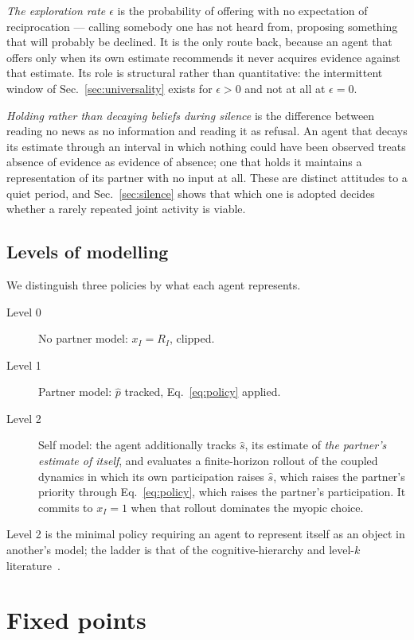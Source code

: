 \documentclass[aps,pre,twocolumn,superscriptaddress,floatfix,longbibliography]{revtex4-2}
\begin{document}
\emph{The exploration rate $\epsilon$} is the probability of offering
with no expectation of reciprocation --- calling somebody one has not heard from,
proposing something that will probably be declined. It is the only route back,
because an agent that offers only when its own estimate recommends it never
acquires evidence against that estimate. Its role is structural rather than
quantitative: the intermittent window of Sec.~\ref{sec:universality} exists for
$\epsilon>0$ and not at all at $\epsilon=0$.

\emph{Holding rather than decaying beliefs during silence} is the
difference between reading no news as no information and reading it as refusal.
An agent that decays its estimate through an interval in which nothing could
have been observed treats absence of evidence as evidence of absence; one that
holds it maintains a representation of its partner with no input at all. These
are distinct attitudes to a quiet period, and Sec.~\ref{sec:silence} shows that
which one is adopted decides whether a rarely repeated joint activity is
viable.

\subsection{Levels of modelling}

We distinguish three policies by what each agent represents.

\begin{description}
\item[Level 0] No partner model: $x_I = R_I$, clipped.
\item[Level 1] Partner model: $\hat p$ tracked, Eq.~\eqref{eq:policy} applied.
\item[Level 2] Self model: the agent additionally tracks $\hat s$, its estimate
  of \emph{the partner's estimate of itself}, and evaluates a finite-horizon
  rollout of the coupled dynamics in which its own participation raises $\hat s$,
  which raises the partner's priority through Eq.~\eqref{eq:policy}, which raises
  the partner's participation. It commits to $x_I=1$ when that rollout dominates
  the myopic choice.
\end{description}

Level 2 is the minimal policy requiring an agent to represent itself as an
object in another's model; the ladder is that of the cognitive-hierarchy and
level-$k$ literature~\cite{camerer2004}.

\section{Fixed points}
\label{sec:fixedpoints}
\end{document}
